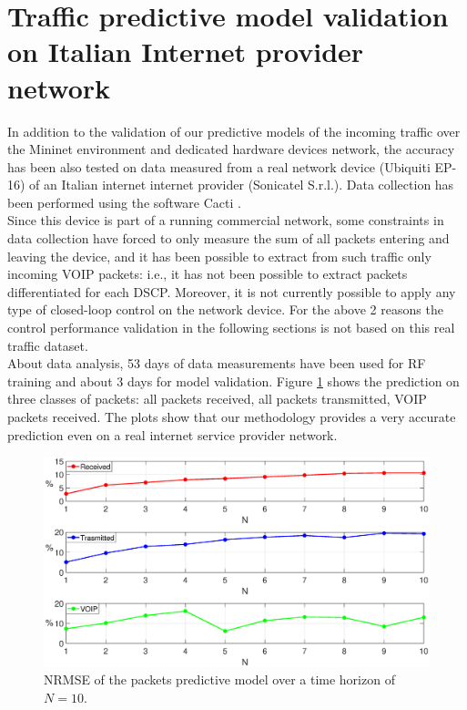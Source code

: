 \section{Traffic predictive model validation on Italian Internet provider network}
In addition to the validation of our predictive models of the incoming traffic over the Mininet environment and dedicated hardware devices network, the accuracy has been also tested on data measured from a real network device (Ubiquiti EP-16) of an Italian internet internet provider (Sonicatel S.r.l.). Data collection has been performed using the software Cacti \cite{Cacti}.\\
Since this device is part of a running commercial network, some constraints in data collection have forced to only measure the sum of all packets entering and leaving the device, and it has been possible to extract from such traffic only incoming VOIP packets: i.e., it has not been possible to extract packets differentiated for each DSCP. Moreover, it is not currently possible to apply any type of closed-loop control on the network device. For the above 2 reasons the control performance validation in the following sections is not based on this real traffic dataset.\\
About data analysis, 53 days of data measurements have been used for RF training and about 3 days for model validation. Figure \ref{fig:{errorPescara}} shows the prediction on three classes of packets: all packets received, all packets transmitted, VOIP packets received. The plots show that our methodology provides a very accurate prediction even on a real internet service provider network.
\begin{figure}[h!]
	\centering
	\includegraphics[trim={120 0 120 0}, width=1\linewidth]{figure/Error_PESCARA_DATA.eps}
	\caption{NRMSE of the packets predictive model over a time horizon of $N=10$.}
	\label{fig:{errorPescara}}
\end{figure}

